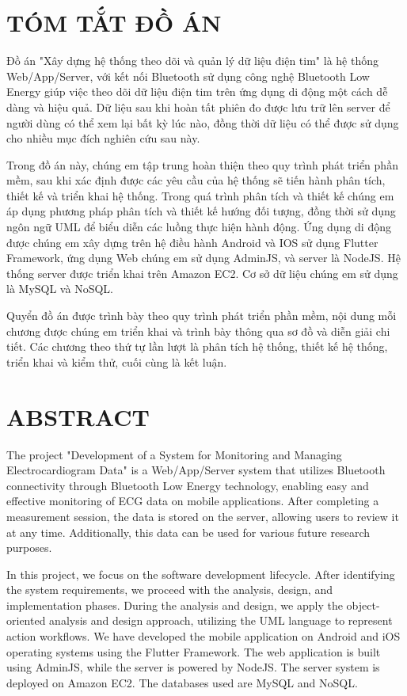 \section*{TÓM TẮT ĐỒ ÁN}

Đồ án "Xây dựng hệ thống theo dõi và quản lý dữ liệu điện tim" là hệ thống Web/App/Server, với kết nối Bluetooth
sử dụng công nghệ Bluetooth Low Energy giúp việc theo dõi dữ liệu điện tim trên ứng dụng di động một cách dễ dàng và
hiệu quả. Dữ liệu sau khi hoàn tất phiên đo được lưu trữ lên server để người dùng có thể xem lại bất kỳ lúc nào, đồng thời
dữ liệu có thể được sử dụng cho nhiều mục đích nghiên cứu sau này.

Trong đồ án này, chúng em tập trung hoàn thiện theo quy trình phát triển phần mềm, sau khi xác định được các yêu cầu của hệ thống
sẽ tiến hành phân tích, thiết kế và triển khai hệ thống. Trong quá trình phân tích và thiết kế chúng em áp dụng phương pháp
phân tích và thiết kế hướng đối tượng, đồng thời sử dụng ngôn ngữ UML để biểu diễn các luồng thực hiện hành động. Ứng dụng di
động được chúng em xây dựng trên hệ điều hành Android và IOS sử dụng Flutter Framework, ứng dụng Web chúng em sử dụng AdminJS, và server
là NodeJS. Hệ thống server được triển khai trên Amazon EC2. Cơ sở dữ liệu chúng em sử dụng là MySQL và NoSQL.

Quyển đồ án được trình bày theo quy trình phát triển phần mềm, nội dung mỗi chương được chúng em triển khai và trình bày thông qua sơ đồ và diễn giải chi tiết. 
Các chương theo thứ tự lần lượt là phân tích hệ thống, thiết kế hệ thống, triển khai và kiểm thử, cuối cùng là kết luận.


\newpage
\section*{ABSTRACT}
The project "Development of a System for Monitoring and Managing Electrocardiogram Data" is a Web/App/Server system that utilizes Bluetooth connectivity through Bluetooth Low Energy technology, enabling easy and effective monitoring of ECG data on mobile applications. After completing a measurement session, the data is stored on the server, allowing users to review it at any time. Additionally, this data can be used for various future research purposes.

In this project, we focus on the software development lifecycle. After identifying the system requirements, 
we proceed with the analysis, design, and implementation phases. During the analysis and design, 
we apply the object-oriented analysis and design approach, utilizing the UML language to represent action workflows. 
We have developed the mobile application on Android and iOS operating systems using the Flutter Framework. 
The web application is built using AdminJS, while the server is powered by NodeJS. 
The server system is deployed on Amazon EC2. The databases used are MySQL and NoSQL.

